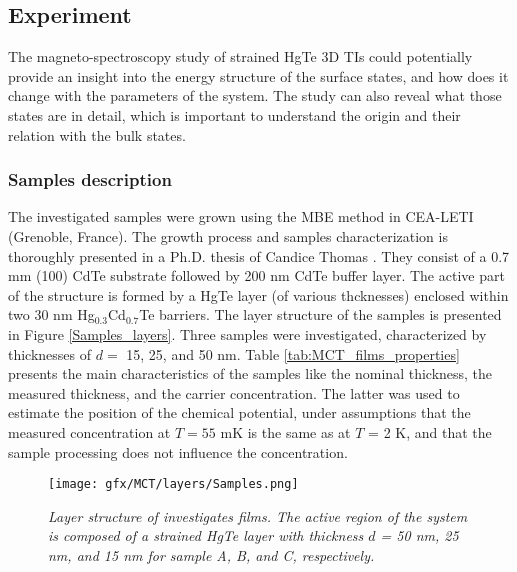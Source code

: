\documentclass[titlepage,a4paper]{book}
\newcommand{\wciecie}{\quad\phantom{v}}
\begin{document}
\subsection{Experiment}
The magneto-spectroscopy study of strained HgTe 3D TIs could potentially provide an insight into the energy structure of the surface states, and how does it change with the parameters of the system. The study can also reveal what those states are in detail, which is important to understand the origin and their relation with the bulk states.
 
\subsubsection{Samples description}
\wciecie
The investigated samples were grown using the MBE method in CEA-LETI (Grenoble, France). The growth process and samples characterization is thoroughly presented in a Ph.D. thesis of Candice Thomas \cite{Thomas_PhD}. They consist of a 0.7 mm (100) CdTe substrate followed by 200 nm CdTe buffer layer. The active part of the structure is formed by a HgTe layer (of various thcknesses) enclosed within two 30 nm Hg$_{0.3}$Cd$_{0.7}$Te barriers. The layer structure of the samples is presented in Figure \ref{Samples_layers}. Three samples were investigated, characterized by thicknesses of $d =$ 15, 25, and 50 nm. Table \ref{tab:MCT_films_properties} presents the main characteristics of the samples like the nominal thickness, the measured thickness, and the carrier concentration. The latter was used to estimate the position of the chemical potential, under assumptions that the measured concentration at $T = 55$ mK is the same as at $T$ = 2 K, and that the sample processing does not influence the concentration.

\begin{figure}[ht]
	\centering
	\texttt{[image: gfx/MCT/layers/Samples.png]}
	\vspace{-10pt}
	\caption{\textit{Layer structure of investigates films. The active region of the system is composed of a strained HgTe layer with thickness $d$ = 50 nm, 25 nm, and 15 nm for sample A, B, and C, respectively.}}
	\label{fig:Samples_layers}
\end{figure} 
\end{document}
